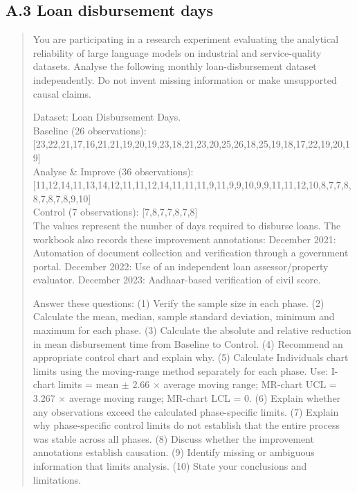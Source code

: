 \documentclass[11pt]{article}
\begin{document}
\subsection*{A.3 Loan disbursement days}
\begin{quote}\small
You are participating in a research experiment evaluating the analytical reliability of large language models on industrial and service-quality datasets. Analyse the following monthly loan-disbursement dataset independently. Do not invent missing information or make unsupported causal claims.

Dataset: Loan Disbursement Days.\\
Baseline (26 observations): [23,\allowbreak{}22,\allowbreak{}21,\allowbreak{}17,\allowbreak{}16,\allowbreak{}21,\allowbreak{}21,\allowbreak{}19,\allowbreak{}20,\allowbreak{}19,\allowbreak{}23,\allowbreak{}18,\allowbreak{}21,\allowbreak{}23,\allowbreak{}20,\allowbreak{}25,\allowbreak{}26,\allowbreak{}18,\allowbreak{}25,\allowbreak{}19,\allowbreak{}18,\allowbreak{}17,\allowbreak{}22,\allowbreak{}19,\allowbreak{}20,\allowbreak{}19]\\
Analyse \& Improve (36 observations): [11,\allowbreak{}12,\allowbreak{}14,\allowbreak{}11,\allowbreak{}13,\allowbreak{}14,\allowbreak{}12,\allowbreak{}11,\allowbreak{}11,\allowbreak{}12,\allowbreak{}14,\allowbreak{}11,\allowbreak{}11,\allowbreak{}11,\allowbreak{}9,\allowbreak{}11,\allowbreak{}9,\allowbreak{}9,\allowbreak{}10,\allowbreak{}9,\allowbreak{}9,\allowbreak{}11,\allowbreak{}11,\allowbreak{}12,\allowbreak{}10,\allowbreak{}8,\allowbreak{}7,\allowbreak{}7,\allowbreak{}8,\allowbreak{}8,\allowbreak{}7,\allowbreak{}8,\allowbreak{}7,\allowbreak{}8,\allowbreak{}9,\allowbreak{}10]\\
Control (7 observations): [7,\allowbreak{}8,\allowbreak{}7,\allowbreak{}7,\allowbreak{}8,\allowbreak{}7,\allowbreak{}8]\\
The values represent the number of days required to disburse loans. The workbook also records these improvement annotations: December 2021: Automation of document collection and verification through a government portal. December 2022: Use of an independent loan assessor/property evaluator. December 2023: Aadhaar-based verification of civil score.

Answer these questions: (1) Verify the sample size in each phase. (2) Calculate the mean, median, sample standard deviation, minimum and maximum for each phase. (3) Calculate the absolute and relative reduction in mean disbursement time from Baseline to Control. (4) Recommend an appropriate control chart and explain why. (5) Calculate Individuals chart limits using the moving-range method separately for each phase. Use: I-chart limits = mean $\pm$ 2.66 $\times$ average moving range; MR-chart UCL = 3.267 $\times$ average moving range; MR-chart LCL = 0. (6) Explain whether any observations exceed the calculated phase-specific limits. (7) Explain why phase-specific control limits do not establish that the entire process was stable across all phases. (8) Discuss whether the improvement annotations establish causation. (9) Identify missing or ambiguous information that limits analysis. (10) State your conclusions and limitations.


\end{quote}
\end{document}
